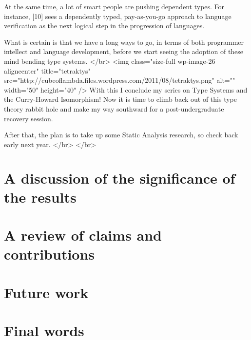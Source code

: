 At the same time, a lot of smart people are pushing dependent types. For instance, [10] sees a dependently typed, pay-as-you-go approach to language verification as the next logical step in the progression of languages.

What is certain is that we have a long ways to go, in terms of both programmer intellect and language development, before we start seeing the adoption of these mind bending type systems.
</br>
<img class="size-full wp-image-26 aligncenter" title="tetraktys" src="http://cubeoflambda.files.wordpress.com/2011/08/tetraktys.png" alt="" width="50" height="40" />
With this I conclude my series on Type Systems and the Curry-Howard Isomorphism! Now it is time to climb back out of this type theory rabbit hole and make my way southward for a post-undergraduate recovery session.

After that, the plan is to take up some Static Analysis research, so check back early next year.
</br>
</br>

\section{A discussion of the significance of the results}

\section{A review of claims and contributions}


\section{Future work}

\section{Final words}
